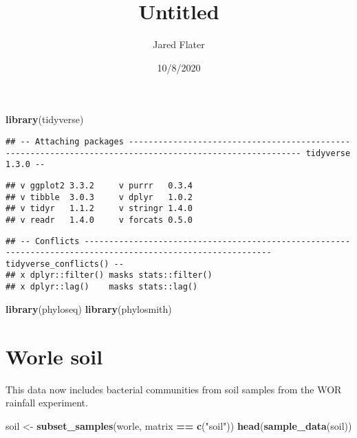 \documentclass[
]{article}
\title{Untitled}
\author{Jared Flater}
\date{10/8/2020}
\newenvironment{Shaded}{\begin{snugshade}}{\end{snugshade}}
\newcommand{\KeywordTok}[1]{\textcolor[rgb]{0.13,0.29,0.53}{\textbf{#1}}}
\newcommand{\NormalTok}[1]{#1}
\newcommand{\OperatorTok}[1]{\textcolor[rgb]{0.81,0.36,0.00}{\textbf{#1}}}
\newcommand{\StringTok}[1]{\textcolor[rgb]{0.31,0.60,0.02}{#1}}
\begin{document}
\maketitle

\begin{Shaded}
\begin{Highlighting}[]
\KeywordTok{library}\NormalTok{(tidyverse)}
\end{Highlighting}
\end{Shaded}

\begin{verbatim}
## -- Attaching packages --------------------------------------------------------------------------------------------------------- tidyverse 1.3.0 --
\end{verbatim}

\begin{verbatim}
## v ggplot2 3.3.2     v purrr   0.3.4
## v tibble  3.0.3     v dplyr   1.0.2
## v tidyr   1.1.2     v stringr 1.4.0
## v readr   1.4.0     v forcats 0.5.0
\end{verbatim}

\begin{verbatim}
## -- Conflicts ------------------------------------------------------------------------------------------------------------ tidyverse_conflicts() --
## x dplyr::filter() masks stats::filter()
## x dplyr::lag()    masks stats::lag()
\end{verbatim}

\begin{Shaded}
\begin{Highlighting}[]
\KeywordTok{library}\NormalTok{(phyloseq)}
\KeywordTok{library}\NormalTok{(phylosmith)}
\end{Highlighting}
\end{Shaded}

\hypertarget{worle-soil}{%
\section{Worle soil}\label{worle-soil}}

This data now includes bacterial communities from soil samples from the
WOR rainfall experiment.

\begin{Shaded}
\begin{Highlighting}[]
\NormalTok{soil <-}\StringTok{ }\KeywordTok{subset_samples}\NormalTok{(worle, matrix }\OperatorTok{==}\StringTok{ }\KeywordTok{c}\NormalTok{(}\StringTok{"soil"}\NormalTok{))}
\KeywordTok{head}\NormalTok{(}\KeywordTok{sample_data}\NormalTok{(soil))}
\end{Highlighting}
\end{Shaded}
\end{document}
